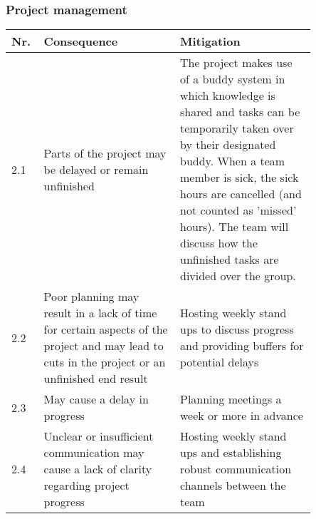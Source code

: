 \documentclass{article} %
\begin{document}
\subsubsection{Project management}

\begin{center}
    \begin{tabular}{| p{0.05\linewidth} | p{0.4\linewidth} | p{0.4\linewidth} |}
        \hline
        Nr. & Consequence                                                                                                                                   & Mitigation                                                                               \\ [0.5ex]
        \hline\hline
        2.1 & Parts of the project may be delayed or remain unfinished                                                                                      & The project makes use of a buddy system in which knowledge is shared and tasks can be temporarily taken over by their designated buddy. When a team member is sick, the sick hours are cancelled (and not counted as 'missed' hours). The team will discuss how the unfinished tasks are divided over the group.                                                                     \\
        \hline
        2.2 & Poor planning may result in a lack of time for certain aspects of the project and may lead to cuts in the project or an unfinished end result & Hosting weekly stand ups to discuss progress and providing buffers for potential delays  \\
        \hline
        2.3 & May cause a delay in progress                                                                                                                 & Planning meetings a week or more in advance                                              \\
        \hline
        2.4 & Unclear or insufficient communication may cause a lack of clarity regarding project progress                                                  & Hosting weekly stand ups and establishing robust communication channels between the team \\
        \hline
    \end{tabular}
\end{center}

\newpage
\end{document}
